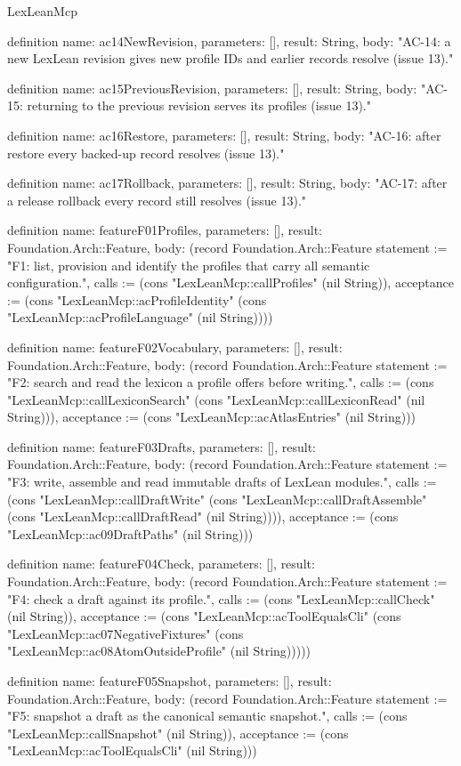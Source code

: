 \begin{lexlean}{LexLeanMcp}
\begin{semanticmodule}
definition{
  name: ac14NewRevision,
  parameters: [],
  result: String,
  body: "AC-14: a new LexLean revision gives new profile IDs and earlier records resolve (issue 13)."
}

definition{
  name: ac15PreviousRevision,
  parameters: [],
  result: String,
  body: "AC-15: returning to the previous revision serves its profiles (issue 13)."
}

definition{
  name: ac16Restore,
  parameters: [],
  result: String,
  body: "AC-16: after restore every backed-up record resolves (issue 13)."
}

definition{
  name: ac17Rollback,
  parameters: [],
  result: String,
  body: "AC-17: after a release rollback every record still resolves (issue 13)."
}

definition{
  name: featureF01Profiles,
  parameters: [],
  result: Foundation.Arch::Feature,
  body: (record Foundation.Arch::Feature {statement := "F1: list, provision and identify the profiles that carry all semantic configuration.", calls := (cons "LexLeanMcp::callProfiles" (nil String)), acceptance := (cons "LexLeanMcp::acProfileIdentity" (cons "LexLeanMcp::acProfileLanguage" (nil String)))})
}

definition{
  name: featureF02Vocabulary,
  parameters: [],
  result: Foundation.Arch::Feature,
  body: (record Foundation.Arch::Feature {statement := "F2: search and read the lexicon a profile offers before writing.", calls := (cons "LexLeanMcp::callLexiconSearch" (cons "LexLeanMcp::callLexiconRead" (nil String))), acceptance := (cons "LexLeanMcp::acAtlasEntries" (nil String))})
}

definition{
  name: featureF03Drafts,
  parameters: [],
  result: Foundation.Arch::Feature,
  body: (record Foundation.Arch::Feature {statement := "F3: write, assemble and read immutable drafts of LexLean modules.", calls := (cons "LexLeanMcp::callDraftWrite" (cons "LexLeanMcp::callDraftAssemble" (cons "LexLeanMcp::callDraftRead" (nil String)))), acceptance := (cons "LexLeanMcp::ac09DraftPaths" (nil String))})
}

definition{
  name: featureF04Check,
  parameters: [],
  result: Foundation.Arch::Feature,
  body: (record Foundation.Arch::Feature {statement := "F4: check a draft against its profile.", calls := (cons "LexLeanMcp::callCheck" (nil String)), acceptance := (cons "LexLeanMcp::acToolEqualsCli" (cons "LexLeanMcp::ac07NegativeFixtures" (cons "LexLeanMcp::ac08AtomOutsideProfile" (nil String))))})
}

definition{
  name: featureF05Snapshot,
  parameters: [],
  result: Foundation.Arch::Feature,
  body: (record Foundation.Arch::Feature {statement := "F5: snapshot a draft as the canonical semantic snapshot.", calls := (cons "LexLeanMcp::callSnapshot" (nil String)), acceptance := (cons "LexLeanMcp::acToolEqualsCli" (nil String))})
}


\end{semanticmodule}
\end{lexlean}
